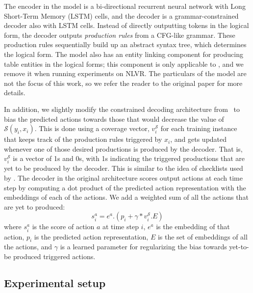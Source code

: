 The encoder in the model is a bi-directional recurrent neural network with Long
Short-Term Memory (LSTM) \citep{hochreiter1997long} cells, and the decoder is a
grammar-constrained decoder also with LSTM cells.  Instead of directly
outputting tokens in the logical form, the decoder outputs \emph{production
rules} from a CFG-like grammar.  These production rules sequentially build up
an abstract syntax tree, which determines the logical form.  The model also has
an entity linking component for producing table entities in the logical forms;
this component is only applicable to \WTQ{}, and we remove it when running
experiments on NLVR.  The particulars of the model are not the focus of this
work, so we refer the reader to the original paper for more details.

In addition, we slightly modify the constrained decoding architecture
from~\cite{krishnamurthy2017neural} to bias the predicted actions towards those
that would decrease the value of $\mathcal{S}(y_i, x_i)$. This is done using a
coverage vector, $v^{\mathcal{S}}_i$ for each training instance that keeps
track of the production rules triggered by $x_i$, and gets updated whenever one
of those desired productions is produced by the decoder. That is,
$v^{\mathcal{S}}_i$ is a vector of 1s and 0s, with 1s indicating the triggered
productions that are yet to be produced by the decoder. This is similar to the
idea of checklists used by \citet{kiddon2016globally}. The decoder in the
original architecture scores output actions at each time step by computing a
dot product of the predicted action representation with the embeddings of each
of the actions. We add a weighted sum of all the actions that are yet to
produced: \begin{equation} s^a_i = e^a . (p_i + \gamma * v^{\mathcal{S}}_i . E)
\end{equation} where $s^a_i$ is the score of action $a$ at time step $i$, $e^a$
is the embedding of that action, $p_i$ is the predicted action representation,
$E$ is the set of embeddings of all the actions, and $\gamma$ is a learned
parameter for regularizing the bias towards yet-to-be produced triggered
actions.

\subsection{Experimental setup}\label{sec:exp_setup}
